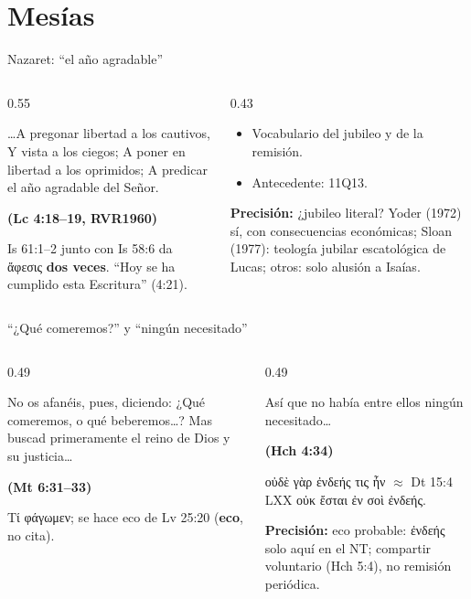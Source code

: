 \documentclass[hyperref={bookmarks=false},aspectratio=169]{beamer}
\newcommand{\grc}[1]{\foreignlanguage{ancientgreek}{#1}}
\newcommand{\fuente}[1]{\par\hfill{\upshape\bfseries\footnotesize\textcolor{tierraroja}{#1}}}
\newcommand{\destacar}[1]{\textbf{\textcolor{tierraroja}{#1}}}
\newcommand{\precision}[1]{{\footnotesize\color{sepia}\textbf{Precisión:} #1}}
\begin{document}
\section{Mesías}

\begin{frame}{Nazaret: ``el año agradable''}
\begin{columns}[c,onlytextwidth]
\begin{column}{0.55\textwidth}
\begin{cita}\ldots{}A pregonar libertad a los cautivos, Y vista a los ciegos; A poner en libertad a los oprimidos; A predicar el año agradable del Señor.\fuente{(Lc 4:18--19, RVR1960)}\end{cita}
\scriptsize Is 61:1--2 junto con Is 58:6 da \grc{ἄφεσις} \destacar{dos veces}. ``Hoy se ha cumplido esta Escritura'' (4:21).
\end{column}
\begin{column}{0.43\textwidth}\small
\begin{itemize}
\item Vocabulario del jubileo y de la remisión.
\item Antecedente: 11Q13.
\end{itemize}
\precision{¿jubileo literal? Yoder (1972) sí, con consecuencias económicas; Sloan (1977): teología jubilar escatológica de Lucas; otros: solo alusión a Isaías.}
\end{column}
\end{columns}
\end{frame}

\begin{frame}{``¿Qué comeremos?'' y ``ningún necesitado''}
\begin{columns}[t,onlytextwidth]
\begin{column}{0.49\textwidth}
\begin{cita}No os afanéis, pues, diciendo: ¿Qué comeremos, o qué beberemos\ldots? Mas buscad primeramente el reino de Dios y su justicia\ldots\fuente{(Mt 6:31--33)}\end{cita}
\scriptsize \grc{Τί φάγωμεν;} se hace eco de Lv 25:20 (\destacar{eco}, no cita).
\end{column}
\begin{column}{0.49\textwidth}
\begin{cita}Así que no había entre ellos ningún necesitado\ldots\fuente{(Hch 4:34)}\end{cita}
\scriptsize \grc{οὐδὲ γὰρ ἐνδεής τις ἦν} $\approx$ Dt 15:4 LXX \grc{οὐκ ἔσται ἐν σοὶ ἐνδεής}.\par
\precision{eco probable: \grc{ἐνδεής} solo aquí en el NT; compartir voluntario (Hch 5:4), no remisión periódica.}
\end{column}
\end{columns}
\end{frame}
\end{document}
